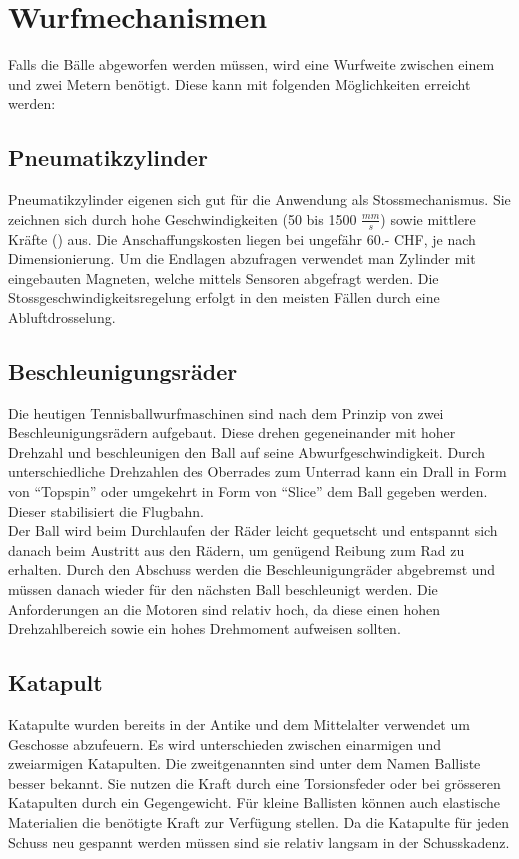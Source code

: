 ﻿\section{Wurfmechanismen}
Falls die Bälle abgeworfen werden müssen, wird eine Wurfweite zwischen einem und zwei Metern benötigt. Diese kann mit folgenden Möglichkeiten erreicht werden:

\subsection{Pneumatikzylinder}
Pneumatikzylinder eigenen sich gut für die Anwendung als Stossmechanismus. Sie zeichnen sich durch hohe Geschwindigkeiten (50 bis 1500 $\frac{mm}{s}$) sowie mittlere Kräfte () aus. Die Anschaffungskosten liegen bei ungefähr 60.- CHF, je nach Dimensionierung. Um die Endlagen abzufragen verwendet man Zylinder mit eingebauten Magneten, welche mittels Sensoren abgefragt werden. Die Stossgeschwindigkeitsregelung erfolgt in den meisten Fällen durch eine Abluftdrosselung.

\subsection{Beschleunigungsräder}
Die heutigen Tennisballwurfmaschinen sind nach dem Prinzip von zwei Beschleunigungsrädern aufgebaut. Diese drehen gegeneinander mit hoher Drehzahl und beschleunigen den Ball auf seine Abwurfgeschwindigkeit. Durch unterschiedliche Drehzahlen des Oberrades zum Unterrad kann ein Drall in Form von \enquote{Topspin} oder umgekehrt in Form von \enquote{Slice} dem Ball gegeben werden. Dieser stabilisiert die Flugbahn.\\
Der Ball wird beim Durchlaufen der Räder leicht gequetscht und entspannt sich danach beim Austritt aus den Rädern, um genügend Reibung zum Rad zu erhalten. Durch den Abschuss werden die Beschleunigungräder abgebremst und müssen danach wieder für den nächsten Ball beschleunigt werden. Die Anforderungen an die Motoren sind relativ hoch, da diese einen hohen Drehzahlbereich sowie ein hohes Drehmoment aufweisen sollten.

\subsection{Katapult}
Katapulte wurden bereits in der Antike und dem Mittelalter verwendet um Geschosse abzufeuern. Es wird unterschieden zwischen einarmigen und zweiarmigen Katapulten. Die zweitgenannten sind unter dem Namen Balliste besser bekannt. Sie nutzen die Kraft durch eine Torsionsfeder oder bei grösseren Katapulten durch ein Gegengewicht. Für kleine Ballisten können auch elastische Materialien die benötigte Kraft zur Verfügung stellen. Da die Katapulte für jeden Schuss neu gespannt werden müssen sind sie relativ langsam in der Schusskadenz. 

